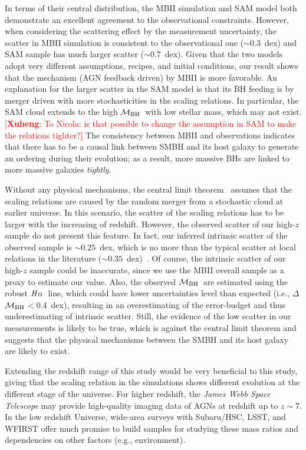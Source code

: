 \documentclass{natureprintstyle}
\newcommand{\mbh}{$\mathcal M_{\rm BH}$}
\newcommand{\halpha}{${\it H}\alpha$}
\newcommand{\ding}[1]{\textcolor{red}{[{\bf Xuheng}: #1]}}
\begin{document}
In terms of their central distribution, the MBII simulation and SAM model both demonstrate an excellent agreement to the observational constraints. However, when considering the scattering effect by the measurement uncertainty, the scatter in MBII simulation is consistent to the observational one ($\sim0.3$~dex) and SAM sample has much larger scatter ($\sim0.7$~dex). Given that the two models adopt very different assumptions, recipes, and initial conditions, our result shows that the mechanism (AGN feedback driven) by MBII is more favorable. An explanation for the larger scatter in the SAM model is that its BH feeding is by merger driven with more stochasticities in the scaling relations. In particular, the SAM cloud extends to the high \mbh\ with low stellar mass, which may not exist. \ding{To Nicola: is that possible to change the assumption in SAM to make the relations tighter?} The consistency between MBII and observations indicates that there has to be a causal link between SMBH and its host galaxy to generate an ordering during their evolution; as a result, more massive BHs are linked to more massive galaxies {\it tightly}.

Without any physical mechanisms, the central limit theorem~\cite{Peng2007, Jahnke2011, Hirschmann2010} assumes that the scaling relations are caused by the random merger from a stochastic cloud at earlier universe. In this scenario, the scatter of the scaling relations has to be larger with the increasing of redshift. However, the observed scatter of our high-$z$ sample do not present this feature. In fact, our inferred intrinsic scatter of the observed sample is $\sim0.25$~dex, which is no more than the typical scatter at local relations in the literature ($\sim0.35$~dex)~\cite{Kormendy13, Gul++09}. Of course, the intrinsic scatter of our high-$z$ sample could be inaccurate, since we use the MBII overall sample as a proxy to estimate our value.
Also, the observed \mbh\ are estimated using the robust \halpha\ line, which could have lower uncertainties level than expected (i.e., $\Delta$\mbh$<0.4$~dex), resulting in an overestimating of the error-budget and thus underestimating of intrinsic scatter. Still, the evidence of the low scatter in our measurements is likely to be true, which is against the central limit theorem and suggests that the physical mechanisms between the SMBH and its host galaxy are likely to exist. 

Extending the redshift range of this study would be very beneficial to this study, giving that the scaling relation in the simulations shows different evolution at the different stage of the universe. For higher redshift, the {\it James Webb Space Telescope} may provide high-quality imaging data of AGNs at redshift up to $z\sim7$. In the low redshift Universe, wide-area surveys with Subaru/HSC, LSST, and WFIRST offer much promise to build samples for studying these mass ratios and dependencies on other factors (e.g., environment).
\end{document}
